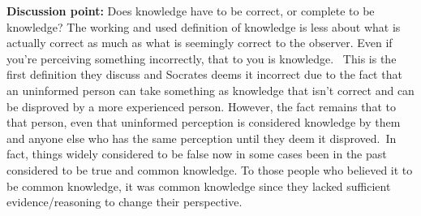 \documentclass[letterpaper]{article}
\begin{document}
\textbf{Discussion point:} Does knowledge have to be correct, or complete to be
knowledge? The working and used definition of knowledge is less about
what is actually correct as much as what is seemingly correct to the
observer. Even if you're perceiving something incorrectly, that to you
is knowledge.  This is the first definition they discuss and Socrates
deems it incorrect due to the fact that an uninformed person can take
something as knowledge that isn't correct and can be disproved by a more
experienced person. However, the fact remains that to that person, even
that uninformed perception is considered knowledge by them and anyone
else who has the same perception until they deem it disproved. In fact,
things widely considered to be false now in some cases been in the past
considered to be true and common knowledge. To those people who believed
it to be common knowledge, it was common knowledge since they lacked
sufficient evidence/reasoning to change their perspective.
\end{document}
